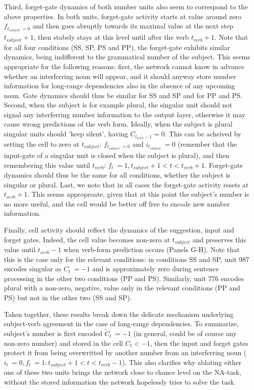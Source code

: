 Third, forget-gate dynamics of both number units also seem to correspond to the above properties. In both units, forget-gate activity starts at value around zero $f_{t_{subject}~=0}$ and then goes abruptly towards its maximal value at the next step $t_{subject}+1$, then stabely stays at this level until after the verb $t_{verb}+1$. Note that for all four conditions (SS, SP, PS and PP), the forget-gate exhibits similar dynamics, being indifferent to the grammatical number of the subject. This seems appropriate for the following reasons: first, the network cannot know in advance whether an interferring noun will appear, and it should anyway store number information for long-range dependencies also in the absence of any upcoming noun. Gate dynamics should thus be similar for SS and SP and for PP and PS. Second, when the subject is for example plural, the singular unit should not signal any interferring number information to the output layer, otherwise it may cause wrong predictions of the verb form. Ideally, when the subject is plural singular units should 'keep silent', having $C_{t_{verb}-1}=0$. This can be acheived by setting the cell to zero at $t_{subject}$: $f_{t_{subject}~=0}$ and $i_{t_{subject}}~=0$ (remember that the input-gate of a singular unit is closed when the subject is plural), and then remembering this value until $t_{verb}$: $f_t ~= 1, t_{subject}+1<t<t_{verb}+1$. Forget-gate dynamics should thus be the same for all conditions, whether the subject is singular or plural. Last, we note that in all cases the forget-gate activity resets at $t_{verb}+1$. This seems approproate, given that at this point the subject's number is no more useful, and the cell would be better off free to encode new number information.
 
Finally, cell activity should reflect the dynamics of the suggestion, input and forget gates. Indeed, the cell value becomes non-zero at $t_{subject}$ and preserves this value until $t_{verb}-1$ when verb-form prediction occurs (Panels G-H). Note that this is the case only for the relevant conditions: in conditions SS and SP, unit 987 encodes singular as $C_t ~= -1$ and is approximately zero during sentence processing in the other two conditions (PP and PS). Similarly, unit 776 encodes plural with a non-zero, negative, value only in the relevant conditions (PP and PS) but not in the other two (SS and SP). 

Taken together, these results break down the delicate mechanism underlying subject-verb agreement in the case of long-range dependencies. To summarize, subject's number is first encoded $\tilde{C}_t~=-1$ (in general, could be of course any non-zero number) and stored in the cell $C_t<-1$, then the input and forget gates protect it from being overwritted by another number from an interferring noun ($i_t~=0, f_t~=1: t_{subject}+1<t<t_{verb}-1$). This also clarifies why ablating either one of these two units brings the network close to chance level on the NA-task, without the stored information the network hopelessly tries to solve the task.


